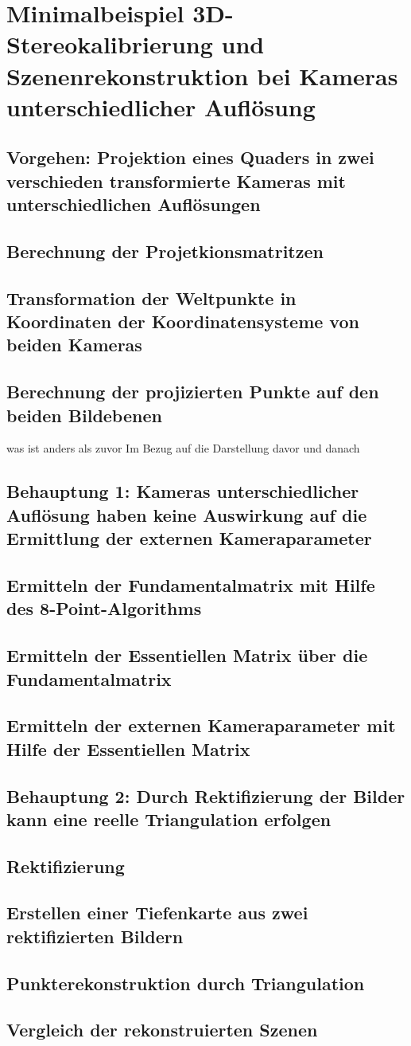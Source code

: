 \chapter{Minimalbeispiel 3D-Stereokalibrierung und Szenenrekonstruktion bei Kameras unterschiedlicher Auflösung}


\section{Vorgehen: Projektion eines Quaders in zwei verschieden transformierte Kameras mit unterschiedlichen Auflösungen}
\section{Berechnung der Projetkionsmatritzen}
\section{Transformation der Weltpunkte in Koordinaten der Koordinatensysteme von beiden Kameras}
\section{Berechnung der projizierten Punkte auf den beiden Bildebenen}
was ist anders als zuvor
Im Bezug auf die Darstellung davor und danach

\section{Behauptung 1: Kameras unterschiedlicher Auflösung haben keine Auswirkung auf die Ermittlung der externen Kameraparameter}
\section{Ermitteln der Fundamentalmatrix mit Hilfe des 8-Point-Algorithms}
\section{Ermitteln der Essentiellen Matrix über die Fundamentalmatrix}
\section{Ermitteln der externen Kameraparameter mit Hilfe der Essentiellen Matrix}
\section{Behauptung 2: Durch Rektifizierung der Bilder kann eine reelle Triangulation erfolgen }
\section{Rektifizierung}
\section{Erstellen einer Tiefenkarte aus zwei rektifizierten Bildern}
\section{Punkterekonstruktion durch Triangulation}
\section{Vergleich der rekonstruierten Szenen}








